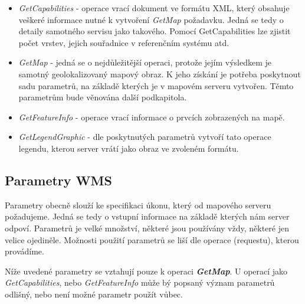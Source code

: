 \begin{itemize}

\item\textit{GetCapabilities} - operace vrací dokument ve formátu XML,
  který obsahuje veškeré informace nutné k vytvoření \textit{GetMap}
  požadavku. Jedná se tedy o detaily samotného servisu jako
  takového. Pomocí GetCapabilities lze zjistit počet vrstev, jejich
  souřadnice v referenčním systému atd.
	
\item\textit{GetMap} - jedná se o nejdůležitější operaci, protože
  jejím výsledkem je samotný geolokalizovaný mapový obraz. K jeho
  získání je potřeba poskytnout sadu parametrů, na základě kterých je
  v mapovém serveru vytvořen. Těmto parametrům bude věnována další
  podkapitola.
	
\item\textit{GetFeatureInfo} - operace vrací informace o prvcích
  zobrazených na mapě.
	
\item\textit{GetLegendGraphic} - dle poskytnutých parametrů vytvoří
  tato operace legendu, kterou server vrátí jako obraz ve zvoleném
  formátu.
\end{itemize}

\subsection{Parametry WMS}

Parametry obecně slouží ke specifikaci úkonu, který od mapového
serveru požadujeme. Jedná se tedy o vstupní informace na základě
kterých nám server odpoví. Parametrů je velké množství, některé jsou
používány vždy, některé jen velice ojediněle. Možnosti použití
parametrů se liší dle operace (requestu), kterou provádíme.

Níže uvedené parametry se vztahují pouze k operaci
\textbf{\textit{GetMap}}. U operací jako \textit{GetCapabilities},
nebo \textit{GetFeatureInfo} může bý popsaný význam parametrů odlišný,
nebo není možné parametr použít vůbec.

